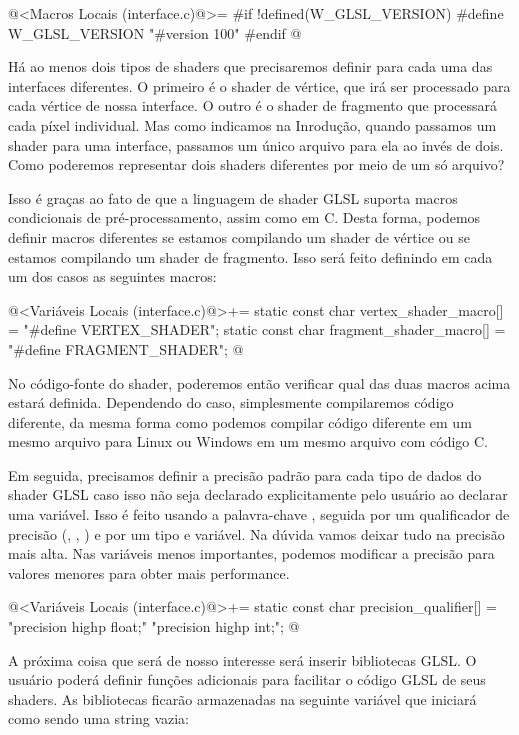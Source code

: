 \iniciocodigo
@<Macros Locais (interface.c)@>=
#if !defined(W_GLSL_VERSION)
#define W_GLSL_VERSION "#version 100\n"
#endif
@
\fimcodigo

Há ao menos dois tipos de shaders que precisaremos definir para cada
uma das interfaces diferentes. O primeiro é o shader de vértice, que
irá ser processado para cada vértice de nossa interface. O outro é o
shader de fragmento que processará cada píxel individual. Mas como
indicamos na Inrodução, quando passamos um shader para uma interface,
passamos um único arquivo para ela ao invés de dois. Como poderemos
representar dois shaders diferentes por meio de um só arquivo?

Isso é graças ao fato de que a linguagem de shader GLSL suporta macros
condicionais de pré-processamento, assim como em C. Desta forma,
podemos definir macros diferentes se estamos compilando um shader de
vértice ou se estamos compilando um shader de fragmento. Isso será
feito definindo em cada um dos casos as seguintes macros:

\iniciocodigo
@<Variáveis Locais (interface.c)@>+=
static const char vertex_shader_macro[] = "#define VERTEX_SHADER\n";
static const char fragment_shader_macro[] = "#define FRAGMENT_SHADER\n";
@
\fimcodigo

No código-fonte do shader, poderemos então verificar qual das duas
macros acima estará definida. Dependendo do caso, simplesmente
compilaremos código diferente, da mesma forma como podemos compilar
código diferente em um mesmo arquivo para Linux ou Windows em um mesmo
arquivo com código C.

Em seguida, precisamos definir a precisão padrão para cada tipo de
dados do shader GLSL caso isso não seja declarado explicitamente pelo
usuário ao declarar uma variável. Isso é feito usando a palavra-chave
, seguida por um qualificador de precisão
(, , ) e por um
tipo e variável. Na dúvida vamos deixar tudo na precisão mais
alta. Nas variáveis menos importantes, podemos modificar a precisão
para valores menores para obter mais performance.

\iniciocodigo
@<Variáveis Locais (interface.c)@>+=
static const char precision_qualifier[] = "precision highp float;\n"
                                          "precision highp int;\n";
@
\fimcodigo

A próxima coisa que será de nosso interesse será inserir bibliotecas
GLSL. O usuário poderá definir funções adicionais para facilitar o
código GLSL de seus shaders. As bibliotecas ficarão armazenadas na
seguinte variável que iniciará como sendo uma string vazia:

